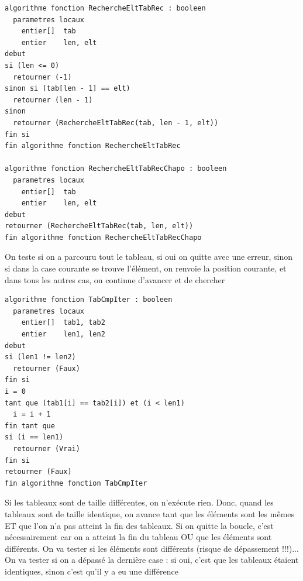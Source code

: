 \documentclass[11pt,a4paper]{article}
\begin{document}
\clearpage

\vfillFirst

\begin{table}[ht!]
  \centering
\begin{lstlisting}[style=algorithmique]
algorithme fonction RechercheEltTabRec : booleen
  parametres locaux
    entier[]  tab
    entier    len, elt
debut
si (len <= 0)
  retourner (-1)
sinon si (tab[len - 1] == elt)
  retourner (len - 1)
sinon
  retourner (RechercheEltTabRec(tab, len - 1, elt))
fin si
fin algorithme fonction RechercheEltTabRec

algorithme fonction RechercheEltTabRecChapo : booleen
  parametres locaux
    entier[]  tab
    entier    len, elt
debut
retourner (RechercheEltTabRec(tab, len, elt))
fin algorithme fonction RechercheEltTabRecChapo \end{lstlisting}
  \caption{On teste si on a parcouru tout le tableau, si oui on quitte avec une erreur, sinon si dans la case courante se trouve l'élément, on renvoie la position courante, et dans tous les autres cas, on continue d'avancer et de chercher}
\end{table}

\vfillLast

\newpage


\vfillFirst



\begin{table}[ht!]
  \centering
\begin{lstlisting}[style=algorithmique]
algorithme fonction TabCmpIter : booleen
  parametres locaux
    entier[]  tab1, tab2
    entier    len1, len2
debut
si (len1 != len2)
  retourner (Faux)
fin si
i = 0
tant que (tab1[i] == tab2[i]) et (i < len1)
  i = i + 1
fin tant que
si (i == len1)
  retourner (Vrai)
fin si
retourner (Faux)
fin algorithme fonction TabCmpIter \end{lstlisting}
  \caption{Si les tableaux sont de taille différentes, on n'exécute rien. Donc, quand les tableaux sont de taille identique, on avance tant que les éléments sont les mêmes ET que l'on n'a pas atteint la fin des tableaux. Si on quitte la boucle, c'est nécessairement car on a atteint la fin du tableau OU que les éléments sont différents. On va tester si les éléments sont différents (risque de dépassement !!!)... On va tester si on a dépassé la dernière case : si oui, c'est que les tableaux étaient identiques, sinon c'est qu'il y a eu une différence}
\end{table}
\end{document}
